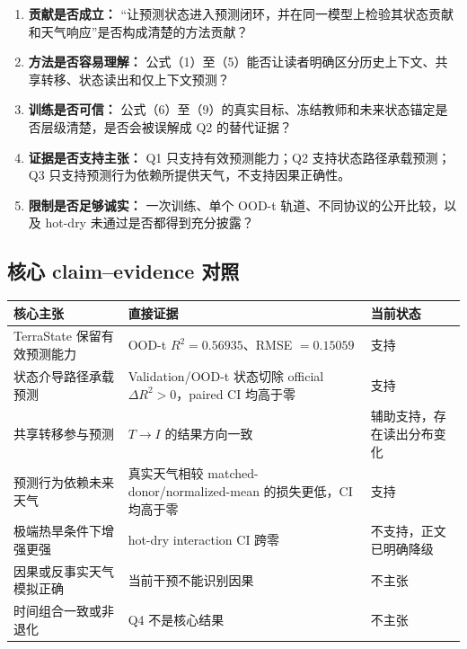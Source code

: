\documentclass[11pt,a4paper,fontset=fandol]{ctexart}
\begin{document}
\begin{enumerate}
\item \textbf{贡献是否成立：} “让预测状态进入预测闭环，并在同一模型上检验其状态贡献和天气响应”是否构成清楚的方法贡献？
\item \textbf{方法是否容易理解：} 公式（1）至（5）能否让读者明确区分历史上下文、共享转移、状态读出和仅上下文预测？
\item \textbf{训练是否可信：} 公式（6）至（9）的真实目标、冻结教师和未来状态锚定是否层级清楚，是否会被误解成 Q2 的替代证据？
\item \textbf{证据是否支持主张：} Q1 只支持有效预测能力；Q2 支持状态路径承载预测；Q3 只支持预测行为依赖所提供天气，不支持因果正确性。
\item \textbf{限制是否足够诚实：} 一次训练、单个 OOD-t 轨道、不同协议的公开比较，以及 hot-dry 未通过是否都得到充分披露？
\end{enumerate}

\subsection{核心 claim–evidence 对照}

\begin{center}
\small
\begin{tabularx}{\textwidth}{@{}Y Y Y@{}}
\toprule
\textbf{核心主张} & \textbf{直接证据} & \textbf{当前状态} \\
\midrule
TerraState 保留有效预测能力 & OOD-t $R^2=0.56935$、RMSE $=0.15059$ & 支持 \\
状态介导路径承载预测 & Validation/OOD-t 状态切除 official $\Delta R^2>0$，paired CI 均高于零 & 支持 \\
共享转移参与预测 & $T\rightarrow I$ 的结果方向一致 & 辅助支持，存在读出分布变化 \\
预测行为依赖未来天气 & 真实天气相较 matched-donor/normalized-mean 的损失更低，CI 均高于零 & 支持 \\
极端热旱条件下增强更强 & hot-dry interaction CI 跨零 & 不支持，正文已明确降级 \\
因果或反事实天气模拟正确 & 当前干预不能识别因果 & 不主张 \\
时间组合一致或非退化 & Q4 不是核心结果 & 不主张 \\
\bottomrule
\end{tabularx}
\end{center}

\clearpage


\end{document}
